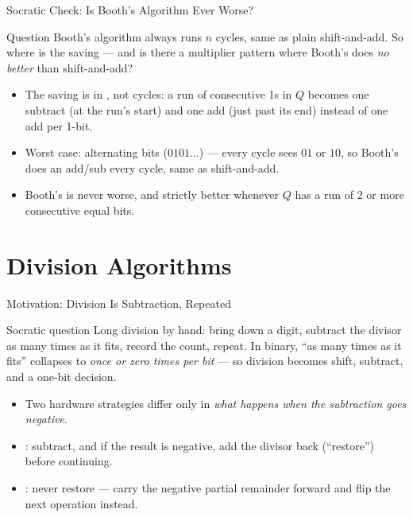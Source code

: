 \documentclass[aspectratio=169]{beamer}
\begin{document}
\begin{frame}{Socratic Check: Is Booth's Algorithm Ever Worse?}
  \begin{alertblock}{Question}
    Booth's algorithm always runs $n$ cycles, same as plain shift-and-add.
    So where is the saving --- and is there a multiplier pattern where Booth's
    does \emph{no better} than shift-and-add?
  \end{alertblock}
  \begin{itemize}
    \item The saving is in , not cycles: a run of
      consecutive 1s in $Q$ becomes one subtract (at the run's start) and one
      add (just past its end) instead of one add per 1-bit.
    \item Worst case: alternating bits ($0101\dots$) --- every cycle sees
      $01$ or $10$, so Booth's does an add/sub every cycle, same as
      shift-and-add.
    \item Booth's is never worse, and strictly better whenever $Q$ has a run
      of 2 or more consecutive equal bits.
  \end{itemize}
\end{frame}


\section{Division Algorithms}

\begin{frame}{Motivation: Division Is Subtraction, Repeated}
  \begin{block}{Socratic question}
    Long division by hand: bring down a digit, subtract the divisor as many
    times as it fits, record the count, repeat. In binary, ``as many times as
    it fits'' collapses to \emph{once or zero times per bit} --- so division
    becomes shift, subtract, and a one-bit decision.
  \end{block}
  \begin{itemize}
    \item Two hardware strategies differ only in \emph{what happens when the
      subtraction goes negative}.
    \item {}: subtract, and if the result is negative,
      add the divisor back (``restore'') before continuing.
    \item {}: never restore --- carry the negative
      partial remainder forward and flip the next operation instead.
  \end{itemize}
\end{frame}
\end{document}
